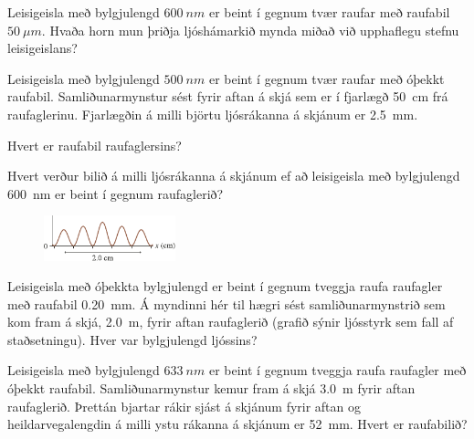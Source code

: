 \begin{enumerate}[label = \textbf{(\alph*)}]

\item[\textbf{(33.2)}] Leisigeisla með bylgjulengd $\SI{600}{nm}$ er beint í gegnum tvær raufar með raufabil $\SI{50}{\mu m}$. Hvaða horn mun þriðja ljóshámarkið mynda miðað við upphaflegu stefnu leisigeislans?

\item[\textbf{(33.3)}] Leisigeisla með bylgjulengd $\SI{500}{nm}$ er beint í gegnum tvær raufar með óþekkt raufabil. Samliðunarmynstur sést fyrir aftan á skjá sem er í fjarlægð \SI{50}{cm} frá raufaglerinu. Fjarlægðin á milli björtu ljósrákanna á skjánum er \SI{2.5}{mm}. \begin{enumerate*}[label = \textbf{(\alph*)}]
    \item Hvert er raufabil raufaglersins?
    \item Hvert verður bilið á milli ljósrákanna á skjánum ef að leisigeisla með bylgjulengd \SI{600}{nm} er beint í gegnum raufaglerið?
\end{enumerate*}

\begin{minipage}{\linewidth}
\begin{figure}
\vspace{-0.5cm}
\includegraphics[width = 1.5in]{figures/rk3336.pdf}
\end{figure}

\item[\textbf{(33.37)}] Leisigeisla með óþekkta bylgjulengd er beint í gegnum tveggja raufa raufagler með raufabil \SI{0.20}{mm}. Á myndinni hér til hægri sést samliðunarmynstrið sem kom fram á skjá, \SI{2.0}{m}, fyrir aftan raufaglerið (grafið sýnir ljósstyrk sem fall af staðsetningu). Hver var bylgjulengd ljóssins?

\end{minipage}

\item[\textbf{(33.35)}] Leisigeisla með bylgjulengd $\SI{633}{nm}$ er beint í gegnum tveggja raufa raufagler með óþekkt raufabil. Samliðunarmynstur kemur fram á skjá \SI{3.0}{m} fyrir aftan raufaglerið. Þrettán bjartar rákir sjást á skjánum fyrir aftan og heildarvegalengdin á milli ystu rákanna á skjánum er \SI{52}{mm}. Hvert er raufabilið?



\end{enumerate}


